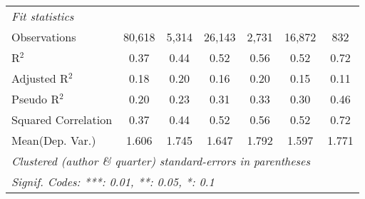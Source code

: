 \begin{tabular}{lcccccc}
   \midrule
   \emph{Fit statistics}\\
   Observations                                               & 80,618       & 5,314         & 26,143       & 2,731   & 16,872      & 832\\  
   R$^2$                                                      & 0.37         & 0.44          & 0.52         & 0.56    & 0.52        & 0.72\\  
   Adjusted R$^2$                                             & 0.18         & 0.20          & 0.16         & 0.20    & 0.15        & 0.11\\  
   Pseudo R$^2$                                               & 0.20         & 0.23          & 0.31         & 0.33    & 0.30        & 0.46\\  
   Squared Correlation                                        & 0.37         & 0.44          & 0.52         & 0.56    & 0.52        & 0.72\\  
Mean(Dep. Var.) & 1.606 & 1.745 & 1.647 & 1.792 & 1.597 & 1.771 \\
   \midrule \midrule
   \multicolumn{7}{l}{\emph{Clustered (author \& quarter) standard-errors in parentheses}}\\
   \multicolumn{7}{l}{\emph{Signif. Codes: ***: 0.01, **: 0.05, *: 0.1}}\\
\end{tabular}
\par\endgroup
